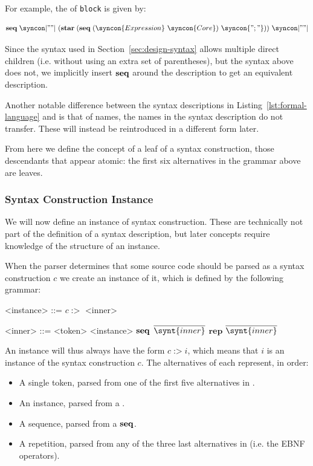 \documentclass{kththesis}
\begin{document}
For example, the  of \texttt{block} is given by:

$$
\seq \syncon|"{"|\ (\repstar (\seq (\syncon{Expression}\ \syncon{Core})\ \syncon{";"}))\ \syncon|"}"|
$$

Since the syntax used in Section~\ref{sec:design-syntax} allows multiple direct children (i.e. without using an extra set of parentheses), but the syntax above does not, we implicitly insert $\mathrel{\mathbf{seq}}$ around the description to get an equivalent description.

Another notable difference between the syntax descriptions in Listing~\ref{lst:formal-language} and  is that of names, the names in the syntax description do not transfer. These will instead be reintroduced in a different form later.

From here we define the concept of a leaf of a syntax construction, those descendants that appear atomic: the first six alternatives in the grammar above are leaves.

\subsubsection{Syntax Construction Instance} \label{sec:defining-instances}

We will now define an instance of syntax construction. These are technically not part of the definition of a syntax description, but later concepts require knowledge of the structure of an instance.

When the parser determines that some source code should be parsed as a syntax construction $c$ we create an instance of it, which is defined by the following grammar:

\newcommand{\repseq}{\mathrel{\mathbf{rep}}}
\newcommand{\tagged}{\mathrel{\textbf{:>}}}

\setlength{\grammarindent}{6.5em}
\begin{grammar}
<instance> ::= $c \tagged$ <inner>

<inner> ::= <token>
  \alt <instance>
  \alt $\mathrel{\mathbf{seq}}$ $\overline{\synt{inner}}$
  \alt $\repseq$ $\overline{\synt{inner}}$
\end{grammar}

An instance will thus always have the form $c \tagged i$, which means that $i$ is an instance of the syntax construction $c$. The alternatives of  each represent, in order:
\begin{itemize}
  \item A single token, parsed from one of the first five alternatives in .
  \item An instance, parsed from a .
  \item A sequence, parsed from a $\mathrel{\mathbf{seq}}$.
  \item A repetition, parsed from any of the three last alternatives in  (i.e. the EBNF operators).
\end{itemize}
\end{document}
